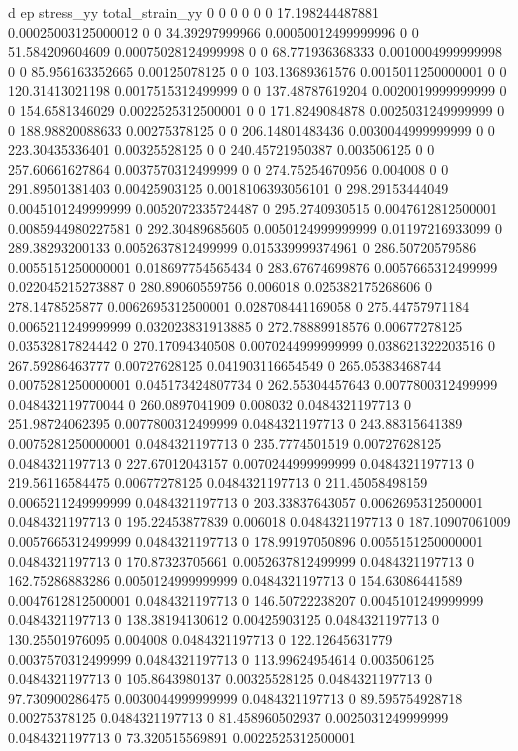 d ep stress_yy total_strain_yy
0 0 0 0
0 0 17.198244487881 0.00025003125000012
0 0 34.39297999966 0.00050012499999996
0 0 51.584209604609 0.00075028124999998
0 0 68.771936368333 0.0010004999999998
0 0 85.956163352665 0.00125078125
0 0 103.13689361576 0.0015011250000001
0 0 120.31413021198 0.0017515312499999
0 0 137.48787619204 0.0020019999999999
0 0 154.6581346029 0.0022525312500001
0 0 171.8249084878 0.0025031249999999
0 0 188.98820088633 0.00275378125
0 0 206.14801483436 0.0030044999999999
0 0 223.30435336401 0.00325528125
0 0 240.45721950387 0.003506125
0 0 257.60661627864 0.0037570312499999
0 0 274.75254670956 0.004008
0 0 291.89501381403 0.00425903125
0.0018106393056101 0 298.29153444049 0.0045101249999999
0.0052072335724487 0 295.2740930515 0.0047612812500001
0.0085944980227581 0 292.30489685605 0.0050124999999999
0.01197216933099 0 289.38293200133 0.0052637812499999
0.015339999374961 0 286.50720579586 0.0055151250000001
0.018697754565434 0 283.67674699876 0.0057665312499999
0.022045215273887 0 280.89060559756 0.006018
0.025382175268606 0 278.1478525877 0.0062695312500001
0.028708441169058 0 275.44757971184 0.0065211249999999
0.032023831913885 0 272.78889918576 0.00677278125
0.03532817824442 0 270.17094340508 0.0070244999999999
0.038621322203516 0 267.59286463777 0.00727628125
0.041903116654549 0 265.05383468744 0.0075281250000001
0.045173424807734 0 262.55304457643 0.0077800312499999
0.048432119770044 0 260.0897041909 0.008032
0.0484321197713 0 251.98724062395 0.0077800312499999
0.0484321197713 0 243.88315641389 0.0075281250000001
0.0484321197713 0 235.7774501519 0.00727628125
0.0484321197713 0 227.67012043157 0.0070244999999999
0.0484321197713 0 219.56116584475 0.00677278125
0.0484321197713 0 211.45058498159 0.0065211249999999
0.0484321197713 0 203.33837643057 0.0062695312500001
0.0484321197713 0 195.22453877839 0.006018
0.0484321197713 0 187.10907061009 0.0057665312499999
0.0484321197713 0 178.99197050896 0.0055151250000001
0.0484321197713 0 170.87323705661 0.0052637812499999
0.0484321197713 0 162.75286883286 0.0050124999999999
0.0484321197713 0 154.63086441589 0.0047612812500001
0.0484321197713 0 146.50722238207 0.0045101249999999
0.0484321197713 0 138.38194130612 0.00425903125
0.0484321197713 0 130.25501976095 0.004008
0.0484321197713 0 122.12645631779 0.0037570312499999
0.0484321197713 0 113.99624954614 0.003506125
0.0484321197713 0 105.8643980137 0.00325528125
0.0484321197713 0 97.730900286475 0.0030044999999999
0.0484321197713 0 89.595754928718 0.00275378125
0.0484321197713 0 81.458960502937 0.0025031249999999
0.0484321197713 0 73.320515569891 0.0022525312500001
